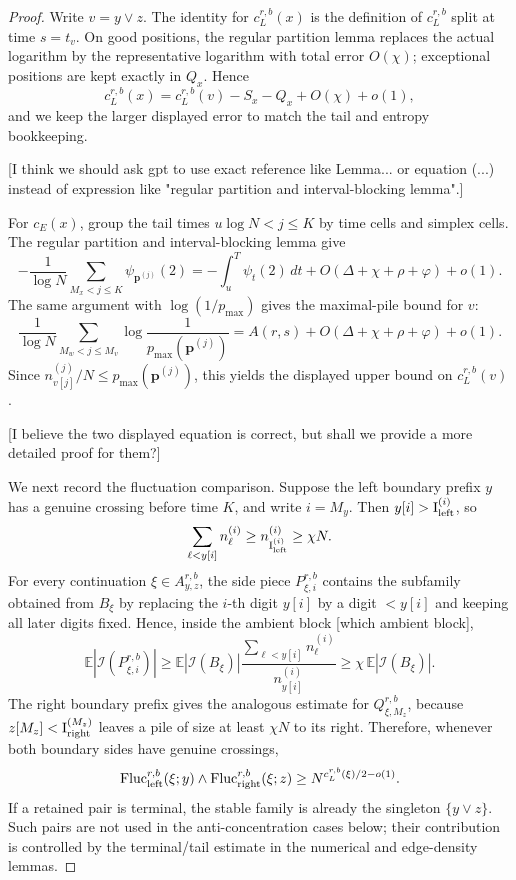 \documentclass[11pt]{article}
\newcommand{\cI}{\mathcal I}
\newcommand{\E}{\mathbb E}
\newcommand{\bp}{\mathbf p}
\newcommand{\ileft}{\mathrm I_{\rm left}}
\newcommand{\iright}{\mathrm I_{\rm right}}
\newcommand{\jscomment}[1]{\textup{\textsf{\color{blue}[#1]}}}
\begin{document}
\begin{proof}
Write \(v=y\vee z\). The identity for \(c_L^{r,b}(x)\) is the definition
of \(c_L^{r,b}\) split at time \(s=t_v\).
On good positions, the regular
partition lemma replaces the actual logarithm by the representative
logarithm with total error \(O(\chi)\); exceptional positions are kept
exactly in \(Q_x\). Hence
\[
    c_L^{r,b}(x)=c_L^{r,b}(v)-S_x-Q_x+O(\chi)+o(1),
\]
and we keep the larger displayed error to match the tail and entropy
bookkeeping.

\jscomment{I think we should ask gpt to use exact reference like Lemma... or equation (...) instead of expression like "regular partition and interval-blocking lemma".}

For \(c_E(x)\), group the tail times \(u\log N<j\le K\) by time cells
and simplex cells. The regular partition and interval-blocking lemma
give
\[
    -\frac1{\log N}\sum_{M_x<j\le K}\psi_{\bp^{(j)}}(2)
    =
    -\int_u^T\psi_t(2)\,dt
    +O(\Delta+\chi+\rho+\varphi)+o(1).
\]
The same argument with \(\log(1/p_{\max})\) gives the maximal-pile bound
for \(v\):
\[
    \frac1{\log N}\sum_{M_w<j\le M_v}
    \log\frac1{p_{\max}(\bp^{(j)})}
    =
    A(r,s)+O(\Delta+\chi+\rho+\varphi)+o(1).
\]
Since \(n_{v[j]}^{(j)}/N\le p_{\max}(\bp^{(j)})\), this yields the
displayed upper bound on \(c_L^{r,b}(v)\).

\jscomment{I believe the two displayed equation is correct, but shall we provide a more detailed proof for them?}

We next record the fluctuation comparison. Suppose the left boundary
prefix \(y\) has a genuine crossing before time \(K\), and write
\(i=M_y\). Then \(y[i]>\ileft^{(i)}\), so
\[
    \sum_{\ell<y[i]}n_\ell^{(i)}\ge n_{\ileft^{(i)}}^{(i)}\ge\chi N .
\]
For every continuation \(\xi\in A_{y,z}^{r,b}\), the side piece
\(P_{\xi,i}^{r,b}\) contains the subfamily obtained from \(B_\xi\) by
replacing the \(i\)-th digit \(y[i]\) by a digit \(<y[i]\) and keeping all
later digits fixed. 
Hence, inside the ambient block \jscomment{which ambient block},
\[
    \E|\cI(P_{\xi,i}^{r,b})|
    \ge
    \E|\cI(B_\xi)|
    \frac{\sum_{\ell<y[i]}n_\ell^{(i)}}{n_{y[i]}^{(i)}}
    \ge
    \chi\,\E|\cI(B_\xi)|.
\]
The right boundary prefix gives the analogous estimate for
\(Q_{\xi,M_z}^{r,b}\), because \(z[M_z]<\iright^{(M_z)}\) leaves a pile
of size at least \(\chi N\) to its right. Therefore, whenever both
boundary sides have genuine crossings,
\[
    \mathrm{Fluc}_{\rm left}^{r,b}(\xi;y)
    \wedge
    \mathrm{Fluc}_{\rm right}^{r,b}(\xi;z)
    \ge
    N^{c_L^{r,b}(\xi)/2-o(1)}.
\]
If a retained pair is terminal, the stable family is already the singleton
\(\{y\vee z\}\). Such pairs are not used in the anti-concentration cases
below; their contribution is controlled by the terminal/tail estimate in
the numerical and edge-density lemmas.


\end{proof}
\end{document}
